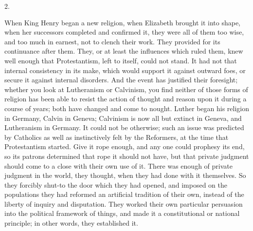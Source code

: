 2.

When King Henry began a new religion, when Elizabeth
brought it into shape, when her successors completed and
confirmed it, they were all of them too wise, and too
much in earnest, not to clench their work. They provided
for its continuance after them. They, or at least the
influences which ruled them, knew well enough that
Protestantism, left to itself, could not stand. It had
not that internal consistency in its make, which would
support it against outward foes, or secure it against
internal disorders. And the event has justified their
foresight; whether you look at Lutheranism or Calvinism,
you find neither of those forms of religion has been able
to resist the action of thought and reason upon it during
a course of years; both have changed and come to nought.
Luther began his religion in Germany, Calvin in Geneva;
Calvinism is now all but extinct in Geneva, and
Lutheranism in Germany. It could not be otherwise; such
an issue was predicted by Catholics as well as
instinctively felt by the Reformers, at the time that
Protestantism started. Give it rope enough, and any one
could prophesy its end, so its patrons determined that
rope it should not have, but that private judgment should
come to a close with their own use of it. There was
enough of private judgment in the world, they thought,
when they had done with it themselves. So they forcibly
shut-to the door which they had opened, and imposed on
the populations they had reformed an artificial tradition
of their own, instead of the liberty of inquiry and
disputation. They worked their own particular persuasion
into the political framework of things, and made it a
constitutional or national principle; in other words,
they established it.

